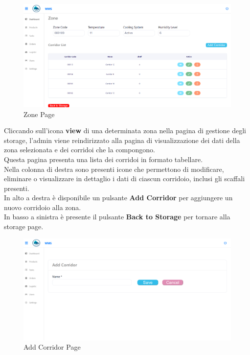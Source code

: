 \begin{figure}[H]
    \centering
    \includegraphics[width=\textwidth]{document/sections/img/Storyboard/viewZone.png}
    \caption{Zone Page}
    \label{fig:zonePage}
\end{figure}

Cliccando sull'icona \textbf{view} di una determinata zona nella pagina di gestione degli storage, l’admin viene reindirizzato alla pagina di visualizzazione dei dati della zona selezionata e dei corridoi che la compongono.\\
Questa pagina presenta una lista dei corridoi in formato tabellare.\\
Nella colonna di destra sono presenti icone che permettono di modificare, eliminare o visualizzare in dettaglio i dati di ciascun corridoio, inclusi gli scaffali presenti.\\
In alto a destra è disponibile un pulsante \textbf{Add Corridor} per aggiungere un nuovo corridoio alla zona.\\
In basso a sinistra è presente il pulsante \textbf{Back to Storage} per tornare alla storage page.

\begin{figure}[H]
    \centering
    \includegraphics[width=\textwidth]{document/sections/img/Storyboard/addCorridorPage.png}
    \caption{Add Corridor Page}
    \label{fig:addCorridorPages}
\end{figure}

